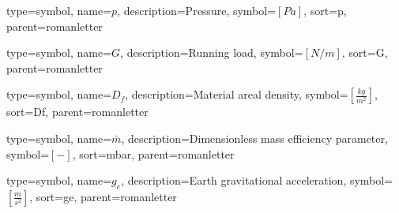 {
	type=symbol, %
	name={\ensuremath{p}}, %
	description={Pressure}, %
	symbol={$\left[Pa\right]$}, %
	sort=p, %
	parent=romanletter %
}

{
type=symbol, %
name={\ensuremath{G}}, %
description={Running load}, %
symbol={$\left[N/m\right]$}, %
sort=G, %
parent=romanletter %
}


{
type=symbol, %
name={\ensuremath{D_f}}, %
description={Material areal density}, %
symbol={$\left[\frac{kg}{m^2}\right]$}, %
sort=Df, %
parent=romanletter %
}

{
type=symbol, %
name={\ensuremath{\bar{m}}}, %
description={Dimensionless mass efficiency parameter}, %
symbol={$\left[-\right]$}, %
sort=mbar, %
parent=romanletter %
}

{
type=symbol, %
name={\ensuremath{g_{e}}}, %
description={Earth gravitational acceleration}, %
symbol={$\left[\frac{m}{s^2} \right]$}, %
sort=ge, %
parent=romanletter %
}

